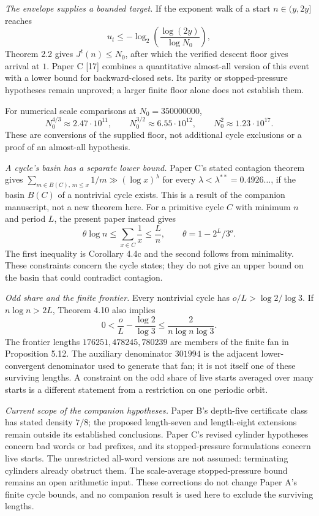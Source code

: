 \documentclass[12pt]{article}
\begin{document}
\emph{The envelope supplies a bounded target.} If the exponent walk of a
start \(n\in(y,2y]\) reaches \[
u_t\le-\log_2\!\left(\frac{\log(2y)}{\log N_0}\right),
\] Theorem 2.2 gives \(J^t(n)\le N_0\), after which the verified descent
floor gives arrival at \(1\). Paper C {[}17{]} combines a quantitative
almost-all version of this event with a lower bound for backward-closed
sets. Its parity or stopped-pressure hypotheses remain unproved; a
larger finite floor alone does not establish them.

For numerical scale comparisons at \(N_0=350000000\), \[
N_0^{4/3}\approx2.47\cdot10^{11},\qquad
N_0^{3/2}\approx6.55\cdot10^{12},\qquad
N_0^2\approx1.23\cdot10^{17}.
\] These are conversions of the supplied floor, not additional cycle
exclusions or a proof of an almost-all hypothesis.

\emph{A cycle's basin has a separate lower bound.} Paper C's stated
contagion theorem gives
\(\sum_{m\in B(C),\,m\le x}1/m\gg(\log x)^\lambda\) for every
\(\lambda<\lambda^{**}=0.4926\ldots\), if the basin \(B(C)\) of a
nontrivial cycle exists. This is a result of the companion manuscript,
not a new theorem here. For a primitive cycle \(C\) with minimum \(n\)
and period \(L\), the present paper instead gives \[
\theta\log n\le\sum_{x\in C}\frac1x\le\frac Ln,
\qquad \theta=1-2^L/3^o.
\] The first inequality is Corollary 4.4c and the second follows from
minimality. These constraints concern the cycle states; they do not give
an upper bound on the basin that could contradict contagion.

\emph{Odd share and the finite frontier.} Every nontrivial cycle has
\(o/L>\log2/\log3\). If \(n\log n>2L\), Theorem 4.10 also implies \[
0<\frac oL-\frac{\log2}{\log3}
\le\frac{2}{n\log n\log3}.
\] The frontier lengths \(176251,478245,780239\) are members of the
finite fan in Proposition 5.12. The auxiliary denominator \(301994\) is
the adjacent lower-convergent denominator used to generate that fan; it
is not itself one of these surviving lengths. A constraint on the odd
share of live starts averaged over many starts is a different statement
from a restriction on one periodic orbit.

\emph{Current scope of the companion hypotheses.} Paper B's depth-five
certificate class has stated density \(7/8\); the proposed length-seven
and length-eight extensions remain outside its established conclusions.
Paper C's revised cylinder hypotheses concern bad words or bad prefixes,
and its stopped-pressure formulations concern live starts. The
unrestricted all-word versions are not assumed: terminating cylinders
already obstruct them. The scale-average stopped-pressure bound remains
an open arithmetic input. These corrections do not change Paper A's
finite cycle bounds, and no companion result is used here to exclude the
surviving lengths.
\end{document}
